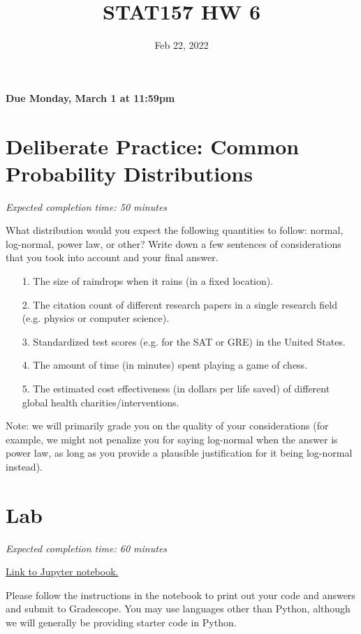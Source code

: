 \documentclass[11pt]{article}
\title{STAT157 HW 6}
\date{Feb 22, 2022}
\begin{document}
\maketitle

\hfill \textbf{Due Monday, March 1 at 11:59pm}

\section*{Deliberate Practice: Common Probability Distributions}

\emph{Expected completion time: 50 minutes}

What distribution would you expect the following quantities to follow: normal, log-normal, power law, or other? Write down a few sentences of considerations that you took into account and your final answer. 

\begin{enumerate}
	\item[1.] The size of raindrops when it rains (in a fixed location).
	\item[2.] The citation count of different research papers in a single research field (e.g. physics or computer science).
	\item[3.] Standardized test scores (e.g. for the SAT or GRE) in the United States.
	\item[4.] The amount of time (in minutes) spent playing a game of chess.
	\item[5.] The estimated cost effectiveness (in dollars per life saved) of different global health charities/interventions.
\end{enumerate}

Note: we will primarily grade you on the quality of your considerations (for example, we might not penalize you for saying log-normal when the answer is power law, as long as you provide a plausible justification for it being log-normal instead).

\section*{Lab}

\emph{Expected completion time: 60 minutes}

\href{https://datahub.berkeley.edu/hub/user-redirect/git-pull?repo=https%3A%2F%2Fgithub.com%2Fjs-d%2Fstat-157-260-website&urlpath=tree%2Fstat-157-260-website%2Fhw%2Fhw6%2Fhw6lab.ipynb&branch=main}{Link to Jupyter notebook.}

Please follow the instructions in the notebook to print out your code and answers and submit to Gradescope. You may use languages other than Python, although we will generally be providing starter code in Python.
\end{document}
